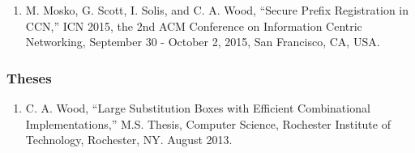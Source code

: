 \documentclass[10pt]{res} %
\begin{document}
\begin{resume}
\begin{enumerate}[P-1.]
	\item M. Mosko, G. Scott, I. Solis, and C. A. Wood, ``Secure Prefix Registration in CCN,'' ICN 2015, the 2nd ACM Conference on Information Centric Networking, September 30 - October 2, 2015, San Francisco, CA, USA.
\end{enumerate}

\vspace{-15pt}
\subsubsection*{Theses}
\begin{enumerate}[D-1.]
	\item C. A. Wood, ``Large Substitution Boxes with Efficient Combinational Implementations,'' M.S. Thesis, Computer Science, Rochester Institute of Technology, Rochester, NY. August 2013.
\end{enumerate}


\vspace{-15pt}

\end{resume}
\end{document}
